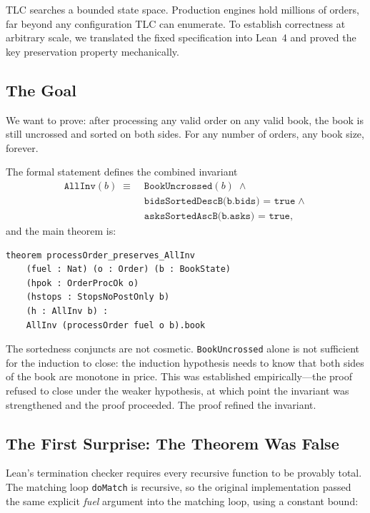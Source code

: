 \documentclass[11pt,a4paper]{article}
\begin{document}
TLC searches a bounded state space. Production engines hold millions of
orders, far beyond any configuration TLC can enumerate. To establish
correctness at arbitrary scale, we translated the fixed specification
into Lean~4 and proved the key preservation property mechanically.

\subsection{The Goal}
\label{sec:lean-goal}

We want to prove: after processing any valid order on any valid book,
the book is still uncrossed and sorted on both sides. For any number of
orders, any book size, forever.

The formal statement defines the combined invariant
\begin{align*}
\texttt{AllInv}(b) \;\equiv\;{}
  & \texttt{BookUncrossed}(b) \;\land\; {}\\
  & \texttt{bidsSortedDescB(b.bids) = true} \;\land\; {}\\
  & \texttt{asksSortedAscB(b.asks) = true},
\end{align*}
and the main theorem is:

\begin{lstlisting}[language={},basicstyle=\ttfamily\footnotesize]
theorem processOrder_preserves_AllInv
    (fuel : Nat) (o : Order) (b : BookState)
    (hpok : OrderProcOk o)
    (hstops : StopsNoPostOnly b)
    (h : AllInv b) :
    AllInv (processOrder fuel o b).book
\end{lstlisting}

The sortedness conjuncts are not cosmetic. \texttt{BookUncrossed} alone
is not sufficient for the induction to close: the induction hypothesis
needs to know that both sides of the book are monotone in price. This
was established empirically---the proof refused to close under the
weaker hypothesis, at which point the invariant was strengthened and the
proof proceeded. The proof refined the invariant.

\subsection{The First Surprise: The Theorem Was False}
\label{sec:lean-fuel}

Lean's termination checker requires every recursive function to be
provably total. The matching loop \texttt{doMatch} is recursive, so the
original implementation passed the same explicit \emph{fuel} argument into
the matching loop, using a constant bound:
\end{document}
